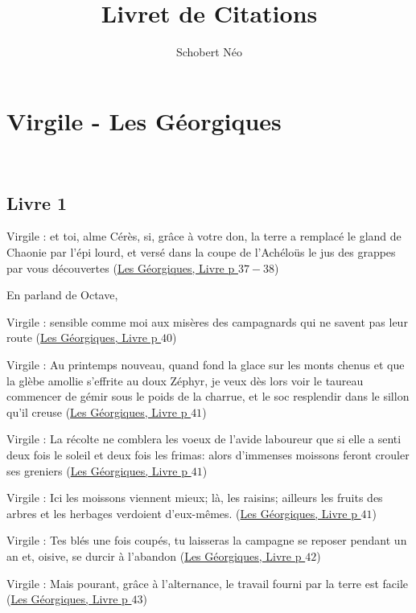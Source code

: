 \documentclass[a4paper, 11pt, hidelinks]{article}
\newcommand{\bs}{\bigskip}
\newcommand{\rb}[1]{\Romanbar{#1}}
\newcommand{\citer}[3]{\bs \begin{center} \textcolor{authorGray}{#1 :} \textcolor{citationRed}{\og #2 \fg} \textcolor{authorGray}{(\underline{#3})} \end{center} \bs}
\begin{document}
\newcommand{\grad}[1]{\vv{grad}#1}


\title{Livret de Citations}
\author{Schobert Néo}

\maketitle

\tableofcontents



\newpage


\section{Virgile - Les Géorgiques} 


\subsection{Livre 1}

\citer{Virgile}{et toi, alme Cérès, si, grâce à votre don, la terre a remplacé le gland de Chaonie par l'épi lourd, 
et versé dans la coupe de l'Achéloüs le jus des grappes par vous découvertes}{Les Géorgiques, Livre \rb{1} p $37-38$}


En parland de Octave, \citer{Virgile}{sensible comme moi aux misères des campagnards qui ne savent pas leur 
route}{Les Géorgiques, Livre \rb{1} p $40$}


\citer{Virgile}{Au printemps nouveau, quand fond la glace sur les monts chenus et que la glèbe amollie s'effrite
au doux Zéphyr, je veux dès lors voir le taureau commencer de gémir sous le poids de la charrue, et le soc
resplendir dans le sillon qu'il creuse}{Les Géorgiques, Livre \rb{1} p $41$}



\citer{Virgile}{La récolte ne comblera les voeux de l'avide laboureur que si elle a senti deux fois le soleil et deux 
fois les frimas: alors d'immenses moissons feront crouler ses greniers}{Les Géorgiques, Livre \rb{1} p $41$}


\citer{Virgile}{Ici les moissons viennent mieux; là, les raisins; ailleurs les fruits des arbres et les herbages verdoient d'eux-mêmes.}{Les Géorgiques, Livre \rb{1} p $41$}


\citer{Virgile}{Tes blés une fois coupés, tu laisseras la campagne se reposer pendant un an et, oisive, se durcir à l'abandon}{Les Géorgiques, Livre \rb{1} p $42$}


\citer{Virgile}{Mais pourant, grâce à l'alternance, le travail fourni par la terre est facile}{Les Géorgiques, Livre \rb{1} p $43$}
\end{document}
